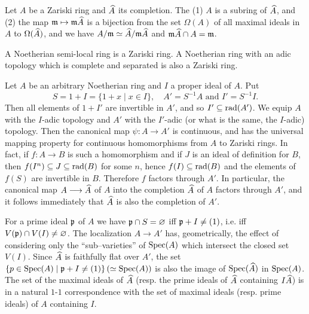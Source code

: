 \documentclass[../main]{subfiles}
\begin{document}
\begin{corollary}
Let $A$ be a Zariski ring and $\widehat{A}$ its completion. The (1) $A$ is a subring of $\widehat{A}$, and (2) the map $\mathfrak{m} \mapsto \mathfrak{m} \widehat{A}$ is a bijection from the set $\Omega(A)$ of all maximal ideals in $A$ to $\Omega(\widehat{A})$, and we have $A/\mathfrak{m} \simeq \widehat{A}/\mathfrak{m} \widehat{A}$ and $\mathfrak{m} \widehat{A} \cap A = \mathfrak{m}$.
\end{corollary}

\newparagraph A Noetherian semi-local ring is a Zariski ring. A Noetherian ring with an adic topology which is complete and separated is also a Zariski ring. 

Let $A$ be an arbitrary Noetherian ring and $I$ a proper ideal of $A$. Put \[S = 1 + I = \{1 + x \mid x \in I\}, \quad A' = S^{-1} A\text{ and }I' = S^{-1} I.\] Then all elements of $1 + I'$ are invertible in $A'$, and so $I' \subseteq \operatorname{rad}(A')$. We equip $A$ with the $I$-adic topology and $A'$ with the $I'$-adic (or what is the same, the $I$-adic) topology. Then the canonical map $\psi : A \longrightarrow A'$ is continuous, and has the universal mapping property for continuous homomorphisms from $A$ to Zariski rings. In fact, if $f : A \longrightarrow B$ is such a homomorphism and if $J$ is an ideal of definition for $B$, then $f(I^n) \subseteq J \subseteq \operatorname{rad}(B)$ for some $n$, hence $f(I) \subseteq \operatorname{rad}(B)$ and the elements of $f(S)$ are invertible in $B$. Therefore $f$ factors through $A'$. In particular, the canonical map $A \longrightarrow \widehat{A}$ of $A$ into the completion $\widehat{A}$ of $A$ factors through $A'$, and it follows immediately that $\widehat{A}$ is also the completion of $A'$. 

For a prime ideal $\mathfrak{p}$ of $A$ we have $\mathfrak{p} \cap S = \varnothing$ iff $\mathfrak{p} + I \ne (1)$, i.e. iff \newline $V(\mathfrak{p}) \cap V(I) \ne \varnothing$. The localization $A \longrightarrow A'$ has, geometrically, the effect of considering only the ``sub--varieties'' of $\operatorname{Spec}(A)$ which intersect the closed set $V(I)$. Since $\widehat{A}$ is faithfully flat over $A'$, the set $\{p \in \operatorname{Spec}(A) \mid \mathfrak{p} + I \ne (1)\} \, (\simeq \operatorname{Spec}(A))$ is also the image of $\operatorname{Spec}(\widehat{A})$ in $\operatorname{Spec}(A)$. The set of the maximal ideals of $\widehat{A}$ (resp. the prime ideals of $\widehat{A}$ containing $I \widehat{A}$) is in a natural $1$-$1$ correspondence with the set of maximal ideals (resp. prime ideals) of $A$ containing $I$. 
\end{document}
